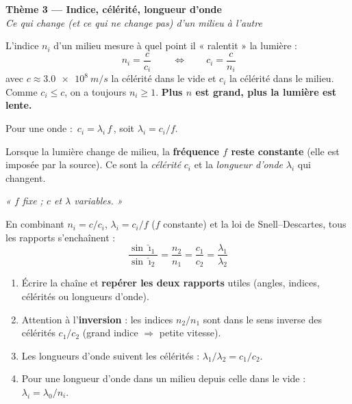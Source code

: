 \documentclass[11pt,a4paper]{article}
\begin{document}

\begin{center}
{\LARGE\bfseries\color{primarydark} Thème 3 — Indice, célérité, longueur d'onde}\\[2pt]
{\color{primary}\itshape Ce qui change (et ce qui ne change pas) d'un milieu à l'autre}
\end{center}

\begin{cle}
L'indice $n_i$ d'un milieu mesure à quel point il « ralentit » la lumière :
\[ \boxed{\,n_i=\dfrac{c}{c_i}\,}\qquad\Longleftrightarrow\qquad c_i=\dfrac{c}{n_i} \]
avec $c\approx\qty{3.0e8}{m/s}$ la célérité dans le vide et $c_i$ la célérité dans le milieu. Comme
$c_i\le c$, on a toujours $n_i\ge1$. \textbf{Plus $n$ est grand, plus la lumière est lente.}
\end{cle}

\begin{cle}
Pour une onde : $\boxed{\,c_i=\lambda_i\,f\,}$, soit $\lambda_i=c_i/f$.

Lorsque la lumière change de milieu, la \textbf{fréquence $f$ reste constante} (elle est imposée par
la source). Ce sont la \emph{célérité} $c_i$ et la \emph{longueur d'onde} $\lambda_i$ qui changent.
\begin{center}\itshape « $f$ fixe ; $c$ et $\lambda$ variables. »\end{center}
\end{cle}

\begin{cle}
En combinant $n_i=c/c_i$, $\lambda_i=c_i/f$ ($f$ constante) et la loi de Snell–Descartes, tous les
rapports s'enchaînent :
\[ \boxed{\;\dfrac{\sin\hat{\imath}_1}{\sin\hat{\imath}_2}=\dfrac{n_2}{n_1}=\dfrac{c_1}{c_2}
   =\dfrac{\lambda_1}{\lambda_2}\;} \]
\end{cle}

\begin{methode}
\begin{enumerate}[leftmargin=1.7em,topsep=2pt,itemsep=1pt]
  \item Écrire la chaîne et \textbf{repérer les deux rapports} utiles (angles, indices, célérités
        ou longueurs d'onde).
  \item Attention à l'\textbf{inversion} : les indices $n_2/n_1$ sont dans le sens inverse des
        célérités $c_1/c_2$ (grand indice $\Rightarrow$ petite vitesse).
  \item Les longueurs d'onde suivent les célérités : $\lambda_1/\lambda_2=c_1/c_2$.
  \item Pour une longueur d'onde dans un milieu depuis celle dans le vide : $\lambda_i=\lambda_0/n_i$.
\end{enumerate}
\end{methode}
\end{document}
